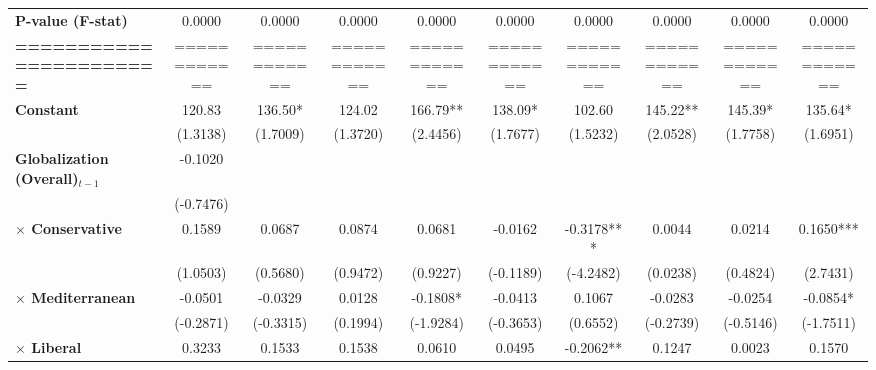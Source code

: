 \begin{center}
\begin{tabular}{lccccccccc}
\textbf{P-value (F-stat)}          &     0.0000     &      0.0000      &      0.0000      &      0.0000      &      0.0000      &      0.0000      &      0.0000      &      0.0000      &      0.0000       \\
\textbf{=======================}   &  ============  &   ============   &   ============   &   ============   &   ============   &   ============   &   ============   &   ============   &   ============    \\
\textbf{Constant}                     &     120.83     &     136.50*      &      124.02      &     166.79**     &     138.09*      &      102.60      &     145.22**     &     145.39*      &     135.64*       \\
\textbf{ }                         &    (1.3138)    &     (1.7009)     &     (1.3720)     &     (2.4456)     &     (1.7677)     &     (1.5232)     &     (2.0528)     &     (1.7758)     &     (1.6951)      \\
\textbf{Globalization (Overall)$_{t-1}$}               &    -0.1020     &                  &                  &                  &                  &                  &                  &                  &                   \\
\textbf{ }                         &   (-0.7476)    &                  &                  &                  &                  &                  &                  &                  &                   \\
\textbf{$\times$ Conservative}         &     0.1589     &      0.0687      &      0.0874      &      0.0681      &     -0.0162      &    -0.3178***    &      0.0044      &      0.0214      &    0.1650***      \\
\textbf{ }                         &    (1.0503)    &     (0.5680)     &     (0.9472)     &     (0.9227)     &    (-0.1189)     &    (-4.2482)     &     (0.0238)     &     (0.4824)     &     (2.7431)      \\
\textbf{$\times$ Mediterranean}        &    -0.0501     &     -0.0329      &      0.0128      &     -0.1808*     &     -0.0413      &      0.1067      &     -0.0283      &     -0.0254      &     -0.0854*      \\
\textbf{ }                         &   (-0.2871)    &    (-0.3315)     &     (0.1994)     &    (-1.9284)     &    (-0.3653)     &     (0.6552)     &    (-0.2739)     &    (-0.5146)     &    (-1.7511)      \\
\textbf{$\times$ Liberal}              &     0.3233     &      0.1533      &      0.1538      &      0.0610      &      0.0495      &    -0.2062**     &      0.1247      &      0.0023      &      0.1570       \\

\end{tabular}
\end{center}
